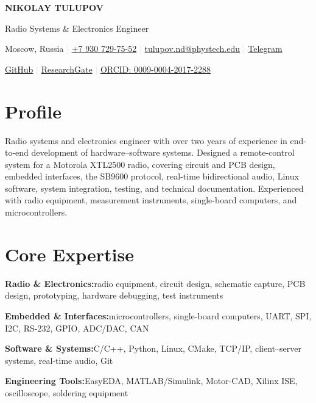 \documentclass[10pt,a4paper]{article}
\newcommand{\skillrow}[2]{%
  \textbf{#1}\hspace{0.45em}#2\par
  \vspace{0.13em}
}
\begin{document}
\begin{center}
  {\fontsize{24}{27}\selectfont\sffamily\bfseries\color{accent}
   NIKOLAY TULUPOV}\par
  \vspace{0.22em}
  {\large\sffamily\color{textgray}
   Radio Systems \& Electronics Engineer}\par
  \vspace{0.48em}
  {\small
    Moscow, Russia
    \enspace\textcolor{lightgray}{|}\enspace
    \href{tel:+79307297552}{+7 930 729-75-52}
    \enspace\textcolor{lightgray}{|}\enspace
    \href{mailto:tulupov.nd@phystech.edu}{tulupov.nd@phystech.edu}
    \enspace\textcolor{lightgray}{|}\enspace
    \href{https://t.me/oncoming_lane}{Telegram}
  }\par
  \vspace{0.16em}
  {\small
    \href{https://github.com/oncominglane}{GitHub}
    \enspace\textcolor{lightgray}{|}\enspace
    \href{https://www.researchgate.net/profile/Nikolay-Tulupov}{ResearchGate}
    \enspace\textcolor{lightgray}{|}\enspace
    \href{https://orcid.org/0009-0004-2017-2288}{ORCID: 0009-0004-2017-2288}
  }
\end{center}

\section{Profile}

Radio systems and electronics engineer with over two years of experience in
end-to-end development of hardware--software systems. Designed a remote-control
system for a Motorola XTL2500 radio, covering circuit and PCB design, embedded
interfaces, the SB9600 protocol, real-time bidirectional audio, Linux software,
system integration, testing, and technical documentation. Experienced with
radio equipment, measurement instruments, single-board computers, and
microcontrollers.

\section{Core Expertise}

\skillrow{Radio \& Electronics:}{radio equipment, circuit design, schematic
capture, PCB design, prototyping, hardware debugging, test instruments}
\skillrow{Embedded \& Interfaces:}{microcontrollers, single-board computers,
UART, SPI, I2C, RS-232, GPIO, ADC/DAC, CAN}
\skillrow{Software \& Systems:}{C/C++, Python, Linux, CMake, TCP/IP,
client--server systems, real-time audio, Git}
\skillrow{Engineering Tools:}{EasyEDA, MATLAB/Simulink, Motor-CAD, Xilinx ISE,
oscilloscope, soldering equipment}
\end{document}
